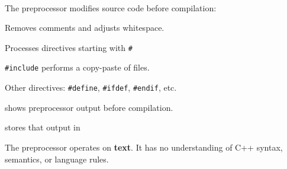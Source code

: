 \documentclass[
    10pt,
    dvipsnames,
    svgnames,
    x11names,
    aspectratio=1610,
    english,
    codeminted]{beamer}
\begin{document}
\begin{frame}[fragile]{\secname}
\framesubtitle{\subsecname}
\begin{compactitem}
   \item The preprocessor modifies source code before compilation:
   \begin{compactitem}
       \item Removes comments and adjusts whitespace.
       \item Processes directives starting with \texttt{#}
       \begin{compactitem}
           \item \texttt{#include} performs a copy-paste of files.
           \item Other directives: \texttt{#define}, \texttt{#ifdef}, \texttt{#endif}, etc.
       \end{compactitem}
   \end{compactitem}
   \item {} shows preprocessor output before compilation.
   \item {} stores that output in 
\end{compactitem}

\medskip
\begin{MyBox}
The preprocessor operates on \textbf{text}. It has no understanding of C++ syntax, semantics, or language rules.
\end{MyBox}
\end{frame}
\end{document}
